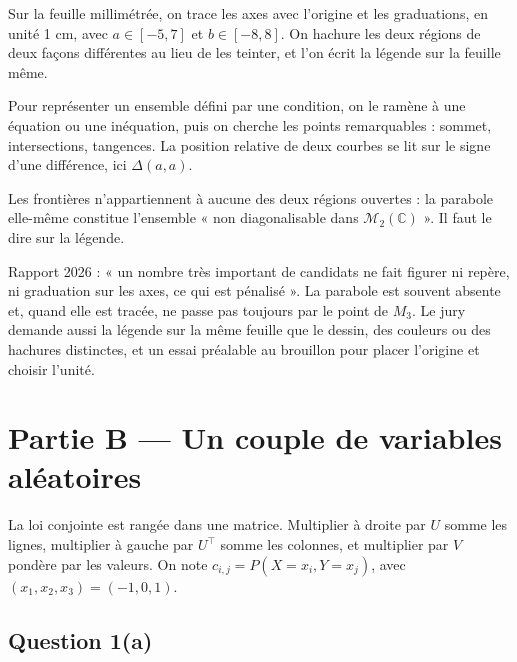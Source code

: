 \documentclass[11pt,a4paper]{article}
\begin{document}
Sur la feuille millimétrée, on trace les axes avec l'origine et les graduations, en unité 1 cm, avec \(a\in[-5,7]\) et \(b\in[-8,8]\). On hachure les deux régions de deux façons différentes au lieu de les teinter, et l'on écrit la légende sur la feuille même.

\begin{methode}

Pour représenter un ensemble défini par une condition, on le ramène à une équation ou une inéquation, puis on cherche les points remarquables : sommet, intersections, tangences. La position relative de deux courbes se lit sur le signe d'une différence, ici \(\Delta(a,a)\).

\end{methode}

\begin{piege}

Les frontières n'appartiennent à aucune des deux régions ouvertes : la parabole elle-même constitue l'ensemble « non diagonalisable dans \({\mathcal{M}}_2(\mathbb{C})\) ». Il faut le dire sur la légende.

\end{piege}

\begin{jury}

Rapport 2026 : « un nombre très important de candidats ne fait figurer ni repère, ni graduation sur les axes, ce qui est pénalisé ». La parabole est souvent absente et, quand elle est tracée, ne passe pas toujours par le point de \(M_3\). Le jury demande aussi la légende sur la même feuille que le dessin, des couleurs ou des hachures distinctes, et un essai préalable au brouillon pour placer l'origine et choisir l'unité.

\end{jury}

\hypertarget{partie-b-un-couple-de-variables-aluxe9atoires}{%
\section{Partie B --- Un couple de variables aléatoires}\label{partie-b-un-couple-de-variables-aluxe9atoires}}

La loi conjointe est rangée dans une matrice. Multiplier à droite par \(U\) somme les lignes, multiplier à gauche par \(U^\top\) somme les colonnes, et multiplier par \(V\) pondère par les valeurs. On note \(c_{i,j}=P(X=x_i,Y=x_j)\), avec \((x_1,x_2,x_3)=(-1,0,1)\).

\hypertarget{question-1a}{%
\subsection{Question 1(a)}\label{question-1a}}
\end{document}
